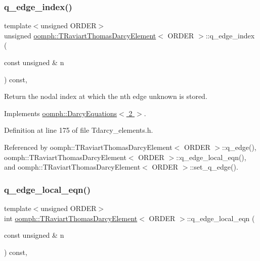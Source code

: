 \subsubsection{\texorpdfstring{q\+\_\+edge\+\_\+index()}{q\_edge\_index()}}
{\footnotesize\ttfamily template$<$unsigned O\+R\+D\+ER$>$ \\
unsigned \hyperlink{classoomph_1_1TRaviartThomasDarcyElement}{oomph\+::\+T\+Raviart\+Thomas\+Darcy\+Element}$<$ O\+R\+D\+ER $>$\+::q\+\_\+edge\+\_\+index (\begin{DoxyParamCaption}\item[{const unsigned \&}]{n }\end{DoxyParamCaption}) const\hspace{0.3cm}{\ttfamily [inline]}, {\ttfamily [virtual]}}



Return the nodal index at which the nth edge unknown is stored. 



Implements \hyperlink{classoomph_1_1DarcyEquations_a2df2b20433444d1c8d3a9b6b9525c1ed}{oomph\+::\+Darcy\+Equations$<$ 2 $>$}.



Definition at line 175 of file Tdarcy\+\_\+elements.\+h.



Referenced by oomph\+::\+T\+Raviart\+Thomas\+Darcy\+Element$<$ O\+R\+D\+E\+R $>$\+::q\+\_\+edge(), oomph\+::\+T\+Raviart\+Thomas\+Darcy\+Element$<$ O\+R\+D\+E\+R $>$\+::q\+\_\+edge\+\_\+local\+\_\+eqn(), and oomph\+::\+T\+Raviart\+Thomas\+Darcy\+Element$<$ O\+R\+D\+E\+R $>$\+::set\+\_\+q\+\_\+edge().

\mbox{\label{classoomph_1_1TRaviartThomasDarcyElement_ac2ff2f6ee57c888dbeac1a9e7b7efc61}} 
\subsubsection{\texorpdfstring{q\+\_\+edge\+\_\+local\+\_\+eqn()}{q\_edge\_local\_eqn()}}
{\footnotesize\ttfamily template$<$unsigned O\+R\+D\+ER$>$ \\
int \hyperlink{classoomph_1_1TRaviartThomasDarcyElement}{oomph\+::\+T\+Raviart\+Thomas\+Darcy\+Element}$<$ O\+R\+D\+ER $>$\+::q\+\_\+edge\+\_\+local\+\_\+eqn (\begin{DoxyParamCaption}\item[{const unsigned \&}]{n }\end{DoxyParamCaption}) const\hspace{0.3cm}{\ttfamily [inline]}, {\ttfamily [virtual]}}



